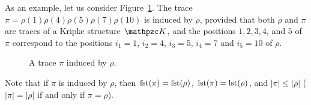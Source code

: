 \begin{example}
As an example, let us consider Figure~\ref{fig:induced}. The trace $\pi = \rho(1)\rho(4)\rho(5)\rho(7)\rho(10)$ is induced by $\rho$, provided that both $\rho$ and $\pi$ are traces of a Kripke structure $\Ku$, and the positions $1, 2, 3, 4$, and $5$ of $\pi$ correspond to the positions $i_1=1$, $i_2=4$, $i_3=5$, $i_4=7$ and $i_5=10$ of $\rho$.

\begin{figure}[H]
    \centering
    \caption{A trace $\pi$ induced by $\rho$.
    }
    \label{fig:induced}
\end{figure}
\end{example}

Note that if $\pi$ is induced by $\rho$, then $\operatorname{fst}(\pi)=\operatorname{fst}(\rho)$, $\operatorname{lst}(\pi)=\operatorname{lst}(\rho)$, and $|\pi|\leq |\rho|$ ($|\pi| = |\rho|$ if and only if $\pi = \rho$). 


